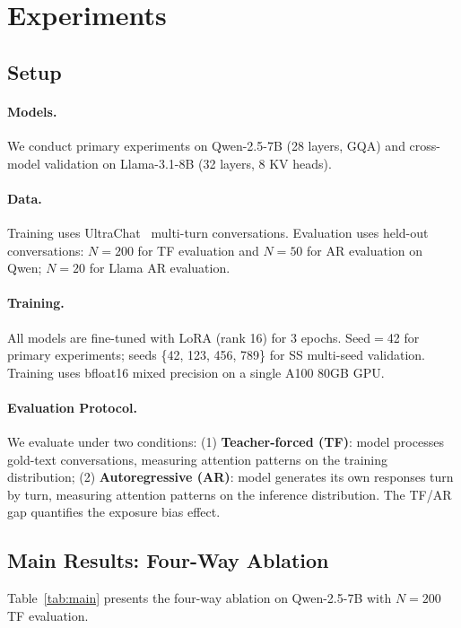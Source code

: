 \documentclass[11pt,a4paper]{article}
\begin{document}
\section{Experiments}

\subsection{Setup}

\paragraph{Models.} We conduct primary experiments on Qwen-2.5-7B (28 layers, GQA) and cross-model validation on Llama-3.1-8B (32 layers, 8 KV heads).

\paragraph{Data.} Training uses UltraChat~\cite{ding2023enhancing} multi-turn conversations. Evaluation uses held-out conversations: $N{=}200$ for TF evaluation and $N{=}50$ for AR evaluation on Qwen; $N{=}20$ for Llama AR evaluation.

\paragraph{Training.} All models are fine-tuned with LoRA (rank 16) for 3 epochs. Seed$=$42 for primary experiments; seeds \{42, 123, 456, 789\} for SS multi-seed validation. Training uses bfloat16 mixed precision on a single A100 80GB GPU.

\paragraph{Evaluation Protocol.} We evaluate under two conditions: (1) \textbf{Teacher-forced (TF)}: model processes gold-text conversations, measuring attention patterns on the training distribution; (2) \textbf{Autoregressive (AR)}: model generates its own responses turn by turn, measuring attention patterns on the inference distribution. The TF/AR gap quantifies the exposure bias effect.

\subsection{Main Results: Four-Way Ablation}

Table~\ref{tab:main} presents the four-way ablation on Qwen-2.5-7B with $N{=}200$ TF evaluation.
\end{document}
